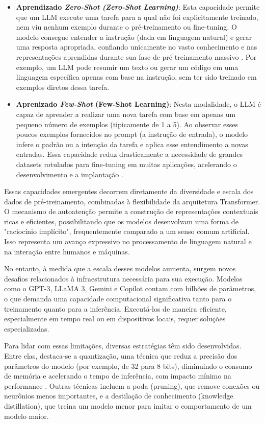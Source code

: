 \begin{itemize}
    \item \textbf{Aprendizado \textit{Zero-Shot} \textit{(Zero-Shot Learning)}}: Esta capacidade permite que um LLM execute uma tarefa para a qual não foi explicitamente treinado, nem viu nenhum exemplo durante o pré-treinamento ou fine-tuning. O modelo consegue entender a instrução (dada em linguagem natural) e gerar uma resposta apropriada, confiando unicamente no vasto conhecimento e nas representações aprendidas durante sua fase de pré-treinamento massivo \cite{brown_language_2020}. Por exemplo, um LLM pode resumir um texto ou gerar um código em uma linguagem específica apenas com base na instrução, sem ter sido treinado em exemplos diretos dessa tarefa. 
    \item \textbf{Aprenizado \textit{Few-Shot} \textbf{(Few-Shot Learning)}}:  Nesta modalidade, o LLM é capaz de aprender a realizar uma nova tarefa com base em apenas um pequeno número de exemplos (tipicamente de 1 a 5). Ao observar esses poucos exemplos fornecidos no prompt (a instrução de entrada), o modelo infere o padrão ou a intenção da tarefa e aplica esse entendimento a novas entradas. Essa capacidade reduz drasticamente a necessidade de grandes datasets rotulados para fine-tuning em muitas aplicações, acelerando o desenvolvimento e a implantação \cite{brown_language_2020}.
\end{itemize}

Essas capacidades emergentes decorrem diretamente da diversidade e escala dos dados de pré-treinamento, combinadas à flexibilidade da arquitetura Transformer. O mecanismo de autoatenção permite a construção de representações contextuais ricas e eficientes, possibilitando que os modelos desenvolvam uma forma de "raciocínio implícito", frequentemente comparado a um senso comum artificial. Isso representa um avanço expressivo no processamento de linguagem natural e na interação entre humanos e máquinas.

No entanto, à medida que a escala desses modelos aumenta, surgem novos desafios relacionados à infraestrutura necessária para sua execução. Modelos como o GPT-3, LLaMA 3, Gemini e Copilot contam com bilhões de parâmetros, o que demanda uma capacidade computacional significativa tanto para o treinamento quanto para a inferência. Executá-los de maneira eficiente, especialmente em tempo real ou em dispositivos locais, requer soluções especializadas.

Para lidar com essas limitações, diversas estratégias têm sido desenvolvidas. Entre elas, destaca-se a quantização, uma técnica que reduz a precisão dos parâmetros do modelo (por exemplo, de 32 para 8 bits), diminuindo o consumo de memória e acelerando o tempo de inferência, com impacto mínimo na performance \cite{ansar_survey_2024}.  Outras técnicas incluem a poda (pruning), que remove conexões ou neurônios menos importantes, e a destilação de conhecimento (knowledge distillation), que treina um modelo menor para imitar o comportamento de um modelo maior.

